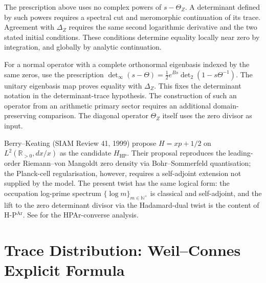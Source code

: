 The prescription above uses no complex powers of $s-\Theta_Z$.
A determinant defined by such powers requires a spectral cut and
meromorphic continuation of its trace. Agreement with $\Delta_Z$
requires the same second logarithmic derivative and the two stated
initial conditions. These conditions determine equality locally
near zero by integration, and globally by analytic continuation.

\begin{remark}
\label{v4-arith:w5-b:rem:det-does-not-buy}
For a normal operator with a complete orthonormal eigenbasis indexed
by the same zeros, use the prescription
$\det_{\infty}(s-\Theta)=\tfrac12e^{Bs}\det_2(1-s\Theta^{-1})$.
The unitary eigenbasis map proves equality with $\Delta_Z$.
This fixes the determinant notation in the determinant-trace
hypothesis. The construction of such an operator from an arithmetic
primary sector requires an additional domain-preserving comparison.
The diagonal operator $\Theta_Z$ itself uses the zero divisor as input.
\end{remark}

\begin{remark}
\label{v4-arith:w5-b:rem:berry-keating-contrast}
Berry--Keating (SIAM Review 41, 1999) propose \(H=xp+1/2\) on
\(L^{2}(\mathbb{R}_{>0},dx/x)\) as the candidate \(H_{\mathrm{HP}}\).
Their proposal reproduces the leading-order Riemann--von Mangoldt
zero density via Bohr--Sommerfeld quantisation; the Planck-cell
regularisation, however, requires a self-adjoint extension not supplied
by the model. The present twist has the same logical form: the occupation
log-prime spectrum \(\{\log m\}_{m\in\mathbb{N}^{\times}}\) is
classical and self-adjoint, and the lift to the zero determinant
divisor via the Hadamard-dual twist is the content of
H-P\(^{\mathrm{Ar}}\). See
 for the HPAr-converse analysis.
\end{remark}

\section{Trace Distribution: Weil--Connes Explicit Formula}
\label{v4-arith:w5-b:trace}


